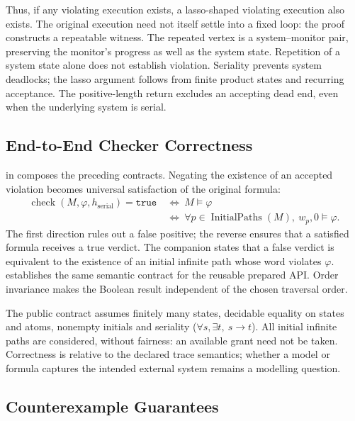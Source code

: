 Thus, if any violating execution exists, a lasso-shaped violating execution
also exists.  The original execution need not itself settle into a fixed
loop: the proof constructs a repeatable witness.  The repeated vertex is a
system--monitor pair, preserving the monitor's progress as well as the system
state.  Repetition of a system state alone does not establish violation.
Seriality prevents system deadlocks; the lasso argument follows from finite
product states and recurring acceptance.  The positive-length return excludes
an accepting dead end, even when the underlying system is serial.

\subsection{End-to-End Checker Correctness}

 in  composes the
preceding contracts.  Negating the existence of an accepted violation becomes
universal satisfaction of the original formula:
\begin{align*}
  \operatorname{check}(M,\varphi,h_{\mathrm{serial}})=\mathtt{true}
  &\ \Longleftrightarrow\ M\models\varphi\\
  &\ \Longleftrightarrow\
    \forall p\in\operatorname{InitialPaths}(M),\ w_p,0\models\varphi.
\end{align*}
The first direction rules out a false positive; the reverse ensures that a
satisfied formula receives a true verdict.  The companion
 states that a false verdict is equivalent to the
existence of an initial infinite path whose word violates $\varphi$.
\lean{PreparedCheck.check_correct} establishes the same semantic contract
for the reusable prepared API.  Order invariance makes the Boolean result
independent of the chosen traversal order.

The public contract assumes finitely many states, decidable equality on states
and atoms, nonempty initials and seriality
($\forall s,\exists t,\ s\to t$).  All initial infinite paths are considered,
without fairness: an available grant need not be taken.  Correctness is
relative to the declared trace semantics; whether a model or formula captures
the intended external system remains a modelling question.

\subsection{Counterexample Guarantees}

